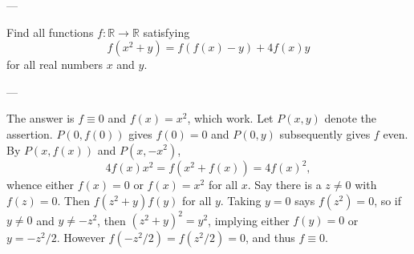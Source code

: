 
---

Find all functions $f:\mathbb R\to\mathbb R$ satisfying \[f(x^2+y)=f(f(x)-y)+4f(x)y\]
for all real numbers $x$ and $y$.

---

The answer is $f\equiv0$ and $f(x)=x^2$, which work. Let $P(x,y)$ denote the assertion. $P(0,f(0))$ gives $f(0)=0$ and $P(0,y)$ subsequently gives $f$ even. By $P(x,f(x))$ and $P(x,-x^2)$, \[4f(x)x^2=f\left(x^2+f(x)\right)=4f(x)^2,\]
whence either $f(x)=0$ or $f(x)=x^2$ for all $x$. Say there is a $z\ne0$ with $f(z)=0$. Then $f(z^2+y)f(y)$ for all $y$. Taking $y=0$ says $f(z^2)=0$, so if $y\ne0$ and $y\ne-z^2$, then $(z^2+y)^2=y^2$, implying either $f(y)=0$ or $y=-z^2/2$. However $f(-z^2/2)=f(z^2/2)=0$, and thus $f\equiv0$.

